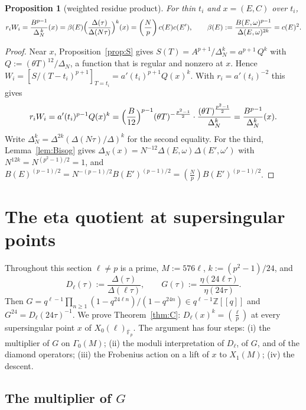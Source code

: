 \documentclass[11pt,a4paper]{article}
\numberwithin{equation}{section}
\newtheorem{proposition}[theorem]{Proposition}
\theoremstyle{definition}
\theoremstyle{remark}
\newcommand{\Fb}{\overline{\mathbb F}_p}
\newcommand{\Z}{\mathbb Z}
\newcommand{\leg}[2]{\left(\frac{#1}{#2}\right)}
\newcommand{\Lp}[1]{\left(\frac{#1}{p}\right)}
\begin{document}
\begin{proposition}[weighted residue product]\label{prop:product}
For thin $t_i$ and $x=(E,C)$ over $t_i$,
\[
r_iW_i=\frac{B^{p-1}}{\Delta_N^{\,k}}(x)=\beta(E)\Bigl(\frac{\Delta(\tau)}{\Delta(N\tau)}\Bigr)^{k}(x)
=\Lp{N}c(E)c(E'),\qquad \beta(E):=\frac{B(E,\omega)^{p-1}}{\Delta(E,\omega)^{2k}}=c(E)^2.
\]
\end{proposition}
\begin{proof}
Near $x$, Proposition~\ref{prop:S} gives $S(T)=A^{p+1}/\Delta_N^k=a^{p+1}\,Q^{k}$ with
$Q:=(\theta T)^{12}/\Delta_N$, a function that is regular and nonzero at $x$. Hence
$W_i=[S/(T-t_i)^{p+1}]_{T=t_i}=a'(t_i)^{p+1}Q(x)^k$. With $r_i=a'(t_i)^{-2}$ this gives
\[
r_iW_i=a'(t_i)^{p-1}Q(x)^k=\Bigl(\frac{B}{12}\Bigr)^{p-1}(\theta T)^{-\frac{p^2-1}2}\cdot
\frac{(\theta T)^{\frac{p^2-1}{2}}}{\Delta_N^{k}}=\frac{B^{p-1}}{\Delta_N^k}(x).
\]
Write $\Delta_N^k=\Delta^{2k}(\Delta(N\tau)/\Delta)^k$ for the second equality. For the third,
Lemma~\ref{lem:Bisog} gives $\Delta_N(x)=N^{-12}\Delta(E,\omega)\Delta(E',\omega')$ with
$N^{12k}=N^{(p^2-1)/2}=1$, and $B(E)^{(p-1)/2}=N^{-(p-1)/2}B(E')^{(p-1)/2}=\Lp NB(E')^{(p-1)/2}$.
\end{proof}

\section{The eta quotient at supersingular points}\label{sec:eta}

Throughout this section $\ell\ne p$ is a prime, $M:=576\ell$, $k:=(p^2-1)/24$, and
\[
D_\ell(\tau):=\frac{\Delta(\tau)}{\Delta(\ell\tau)},\qquad
G(\tau):=\frac{\eta(24\ell\tau)}{\eta(24\tau)}.
\]
Then $G=q^{\ell-1}\prod_{n\ge1}(1-q^{24\ell n})/(1-q^{24n})\in q^{\ell-1}\Z[[q]]$
and $G^{24}=D_\ell(24\tau)^{-1}$.
We prove Theorem~\ref{thm:C}: $D_\ell(x)^{k}=\leg{\ell}{p}$ at every supersingular point $x$ of
$X_0(\ell)_{\Fb}$. The argument has four steps: (i) the multiplier of $G$ on $\Gamma_0(M)$; (ii) the
moduli interpretation of $D_\ell$, of $G$, and of the diamond operators; (iii) the Frobenius action
on a lift of $x$ to $X_1(M)$; (iv) the descent.

\subsection{The multiplier of \texorpdfstring{$G$}{G}}
\end{document}
